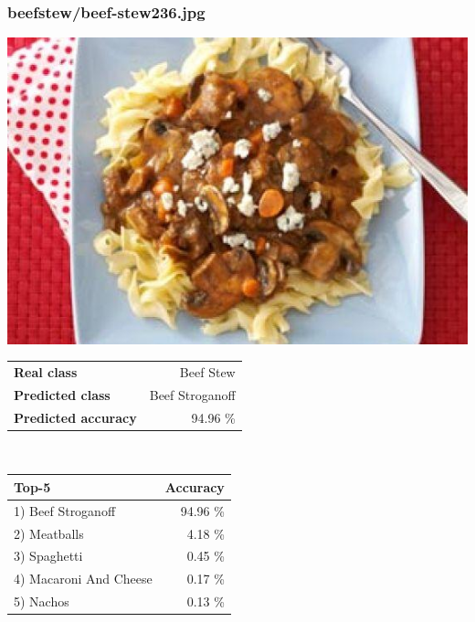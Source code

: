 \subsubsection{beef\textunderscore stew/beef-stew236.jpg}

\begin{minipage}[t]{0.4\textwidth}
	\vspace{0pt}
	\includegraphics[width=\linewidth]{images/evaluation-images/beef_stew/beef-stew236.jpg}
\end{minipage}
\hfill
\begin{minipage}[t]{0.5\textwidth}
	\vspace{0pt}\raggedright
	\begin{tabularx}{\textwidth}{X r}
		\small \textbf{Real class} & \small Beef Stew\\
		\small \textbf{Predicted class} & \small Beef Stroganoff\\
		\small \textbf{Predicted accuracy} & \small 94.96 \%
    \end{tabularx}\\
    
    \vspace{6pt}
	\begin{tabularx}{\textwidth}{X r}
        \small \textbf{Top-5} & \small \textbf{Accuracy} \\
        \hline
		\small 1) Beef Stroganoff & \small 94.96 \%\\\small 2) Meatballs & \small 4.18 \%\\\small 3) Spaghetti & \small 0.45 \%\\\small 4) Macaroni And Cheese & \small 0.17 \%\\\small 5) Nachos & \small 0.13 \%
    \end{tabularx}
\end{minipage}
    
